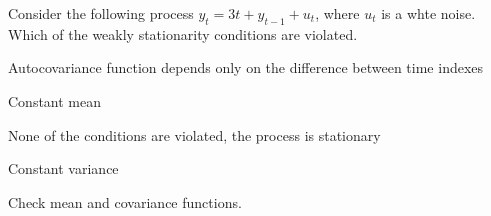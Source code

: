 
\begin{question}
Consider the following process \(y_t = 3t + y_{t-1}+u_t\), where \(u_t\) is a whte noise.
Which of the weakly stationarity conditions are violated.
\begin{answerlist}
  \item Autocovariance function depends only on the difference between time indexes
  \item Constant mean
  \item None of the conditions are violated, the process is stationary
  \item Constant variance
\end{answerlist}
\end{question}

\begin{solution}
Check mean and covariance functions.
\end{solution}

